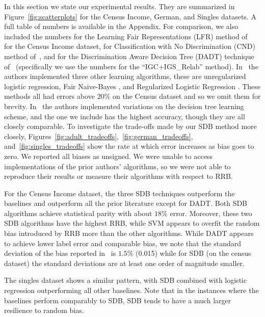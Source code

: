 \documentclass[twoside,leqno,twocolumn]{article}
\begin{document}
In this section we state our experimental results. They are summarized in
Figure~\ref{fig:scatterplots} for the Census Income, German, and Singles
datasets. A full table of numbers is available in the Appendix. For comparison,
we also included the numbers for the Learning Fair Representations (LFR) method
of~\cite{ZemelWSPD13} for the Census Income dataset, for Classification with No
Discrimination (CND) method of~\cite{KamiranC09}, and for the Discrimination
Aware Decision Tree (DADT) technique of~\cite{KamiranCP10} (specifically we use
the numbers for the ``IGC+IGS\_Relab'' method). In~\cite{ZemelWSPD13} the
authors implemented three other learning algorithms, these are unregularized
logistic regression, Fair Naive-Bayes \cite{KamiranC09}, and Regularized
Logistic Regression \cite{KamashimaAS11}. These methods all had errors above
$20\%$ on the Census dataset and so we omit them for brevity.
In~\cite{KamiranCP10} the authors implemented variations on the decision tree
learning scheme, and the one we include has the highest accuracy, though they
are all closely comparable. To investigate the trade-offs made by our SDB
method more closely,
Figures~\ref{fig:adult_tradeoffs},~\ref{fig:german_tradeoffs},
and~\ref{fig:singles_tradeoffs} show the rate at which error increases as bias
goes to zero. We reported all biases as unsigned. We were unable to access
implementations of the prior authors' algorithms, so we were not able to
reproduce their results or measure their algorithms with respect to RRB.

For the Census Income dataset, the three SDB techniques outperform the
baselines and outperform all the prior literature except for DADT. Both SDB
algorithms achieve statistical parity with about $18\%$ error. Moreover, these
two SDB algorithms have the highest RRB, while SVM appears to overfit the
random bias introduced by RRB more than the other algorithms. While DADT
appears to achieve lower label error and comparable bias, we note that the
standard deviation of the bias reported in~\cite{KamiranCP10} is $1.5\%$
(0.015) while for SDB (on the census dataset) the standard deviations are at
least one order of magnitude smaller. 

The singles dataset shows a similar pattern, with SDB combined with logistic
regression outperforming all other baselines. Note that in the instances where
the baselines perform comparably to SDB, SDB tends to have a much larger
resilience to random bias.
\end{document}
